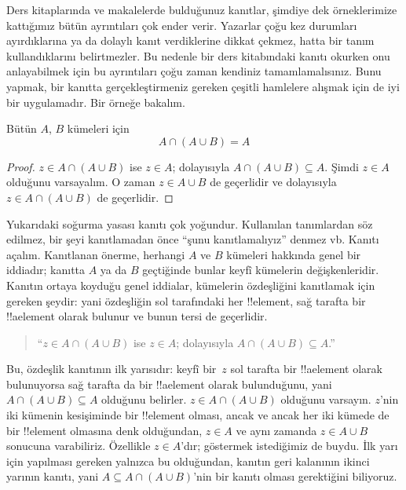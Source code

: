 


Ders kitaplarında ve makalelerde bulduğunuz kanıtlar, şimdiye dek
örneklerimize kattığımız bütün ayrıntıları çok ender verir. Yazarlar
çoğu kez durumları ayırdıklarına ya da dolaylı kanıt verdiklerine dikkat
çekmez, hatta bir tanım kullandıklarını belirtmezler. Bu nedenle bir
ders kitabındaki kanıtı okurken onu anlayabilmek için bu ayrıntıları
çoğu zaman kendiniz tamamlamalısınız. Bunu yapmak, bir kanıtta
gerçekleştirmeniz gereken çeşitli hamlelere alışmak için de iyi bir
uygulamadır. Bir örneğe bakalım.

\begin{prop}[Soğurma]
Bütün $A$, $B$ kümeleri için
\[
A \cap (A \cup B) = A
\]
\end{prop}

\begin{proof}
$z \in A \cap (A \cup B)$ ise $z \in A$; dolayısıyla $A \cap (A \cup
B) \subseteq A$. Şimdi $z \in A$ olduğunu varsayalım. O zaman $z \in
A \cup B$ de geçerlidir ve dolayısıyla $z \in A \cap (A \cup B)$ de
geçerlidir.
\end{proof}

Yukarıdaki soğurma yasası kanıtı çok yoğundur. Kullanılan tanımlardan
söz edilmez, bir şeyi kanıtlamadan önce ``şunu kanıtlamalıyız'' denmez
vb. Kanıtı açalım. Kanıtlanan önerme, herhangi $A$ ve $B$ kümeleri
hakkında genel bir iddiadır; kanıtta $A$ ya da $B$ geçtiğinde bunlar
keyfî kümelerin değişkenleridir. Kanıtın ortaya koyduğu genel iddialar,
kümelerin özdeşliğini kanıtlamak için gereken şeydir: yani özdeşliğin
sol tarafındaki her !!{element}, sağ tarafta bir !!a{element} olarak bulunur ve
bunun tersi de geçerlidir.

\begin{quote}
``$z \in A \cap (A \cup B)$ ise $z \in A$; dolayısıyla $A \cap (A \cup
B) \subseteq A$.''
\end{quote}

Bu, özdeşlik kanıtının ilk yarısıdır: keyfî bir~$z$ sol tarafta bir
!!a{element} olarak bulunuyorsa sağ tarafta da bir !!a{element} olarak bulunduğunu, yani $A
  \cap (A \cup B) \subseteq A$ olduğunu belirler. $z \in A \cap (A \cup
  B)$ olduğunu varsayın. $z$'nin iki kümenin kesişiminde bir !!{element}
  olması, ancak ve ancak her iki kümede de bir !!{element} olmasına denk
  olduğundan, $z \in A$ ve aynı zamanda $z \in A \cup B$ sonucuna varabiliriz. Özellikle $z \in
A$'dır; göstermek istediğimiz de buydu. İlk yarı için yapılması gereken
yalnızca bu olduğundan, kanıtın geri kalanının ikinci yarının kanıtı,
yani $A \subseteq A \cap (A \cup B)$'nin bir kanıtı olması gerektiğini
biliyoruz.

